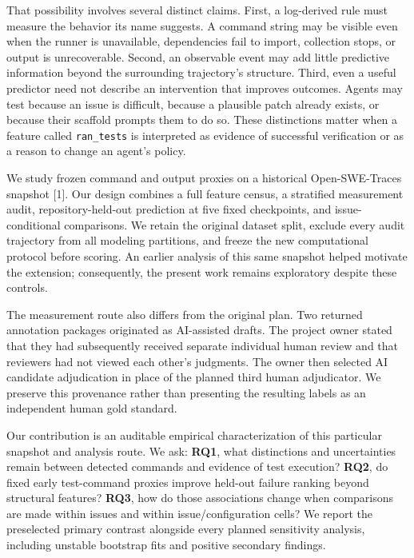 \documentclass[10pt,a4paper]{article}
\begin{document}
That possibility involves several distinct claims. First, a log-derived rule must measure the behavior its name suggests. A command string may be visible even when the runner is unavailable, dependencies fail to import, collection stops, or output is unrecoverable. Second, an observable event may add little predictive information beyond the surrounding trajectory's structure. Third, even a useful predictor need not describe an intervention that improves outcomes. Agents may test because an issue is difficult, because a plausible patch already exists, or because their scaffold prompts them to do so. These distinctions matter when a feature called \texttt{ran\_tests} is interpreted as evidence of successful verification or as a reason to change an agent's policy.

We study frozen command and output proxies on a historical Open-SWE-Traces snapshot [1]. Our design combines a full feature census, a stratified measurement audit, repository-held-out prediction at five fixed checkpoints, and issue-conditional comparisons. We retain the original dataset split, exclude every audit trajectory from all modeling partitions, and freeze the new computational protocol before scoring. An earlier analysis of this same snapshot helped motivate the extension; consequently, the present work remains exploratory despite these controls.

The measurement route also differs from the original plan. Two returned annotation packages originated as AI-assisted drafts. The project owner stated that they had subsequently received separate individual human review and that reviewers had not viewed each other's judgments. The owner then selected AI candidate adjudication in place of the planned third human adjudicator. We preserve this provenance rather than presenting the resulting labels as an independent human gold standard.

Our contribution is an auditable empirical characterization of this particular snapshot and analysis route. We ask: \textbf{RQ1}, what distinctions and uncertainties remain between detected commands and evidence of test execution? \textbf{RQ2}, do fixed early test-command proxies improve held-out failure ranking beyond structural features? \textbf{RQ3}, how do those associations change when comparisons are made within issues and within issue/configuration cells? We report the preselected primary contrast alongside every planned sensitivity analysis, including unstable bootstrap fits and positive secondary findings.
\end{document}
